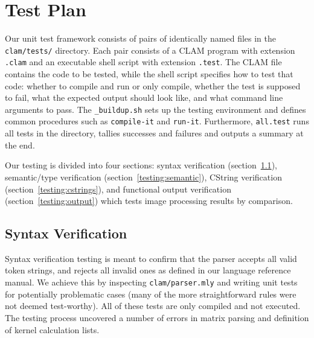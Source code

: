 \chapter{Test Plan}
\label{chap:testplan}

Our unit test framework consists of pairs of identically named files in the \texttt{clam/tests/} directory.
Each pair consists of a CLAM program with extension \texttt{.clam} and an executable shell script
with extension \texttt{.test}. The CLAM file contains the code to be tested, while the shell script
specifies how to test that code: whether to compile and run or only compile, whether the test is supposed to fail,
what the expected output should look like, and what command line arguments to pass.
The \texttt{_buildup.sh} sets up the testing environment and defines common procedures such as
\texttt{compile-it} and \texttt{run-it}. Furthermore, \texttt{all.test} runs all tests in the directory,
tallies successes and failures and outputs a summary at the end.

Our testing is divided into four sections: syntax verification (section~\ref{testing:syntax}),
semantic/type verification (section~\ref{testing:semantic}),
CString verification (section~\ref{testing:cstrings}),
and functional output verification (section~\ref{testing:output}) which tests image processing results by comparison.

\section{Syntax Verification}
\label{testing:syntax}

Syntax verification testing is meant to confirm that the parser accepts all valid token strings,
and rejects all invalid ones as defined in our language reference manual.
We achieve this by inspecting \texttt{clam/parser.mly} and writing unit tests for
potentially problematic cases (many of the more straightforward rules were not deemed test-worthy).
All of these tests are only compiled and not executed. The testing process uncovered a number of errors
in matrix parsing and definition of kernel calculation lists.\\

